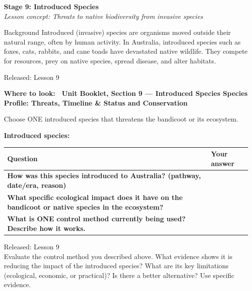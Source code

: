 \documentclass[11pt,a4paper]{article}
\newcommand{\wheretolook}[1]{%
  \par\vspace{2pt}\noindent
  \colorbox{GoldLight}{\parbox{\dimexpr\linewidth-2\fboxsep\relax}{%
    \small\color{GoldDark}\headingfont\bfseries Where to look:\ %
    \normalfont\color{DarkGrey}#1}}\par\vspace{4pt}}
\newcommand{\answerbox}[1]{%
  \begin{tcolorbox}[
    enhanced, breakable, arc=2mm,
    colback=Paper, colframe=Line,
    left=2mm, right=2mm, top=1mm, bottom=1mm,
    boxrule=1pt, height=#1
  ]
  \end{tcolorbox}%
}
\newcommand{\stagediv}[3]{%
  \needspace{6\baselineskip}
  \begin{tcolorbox}[
    enhanced, breakable=false, arc=3.5mm,
    colback=ForestDark, colframe=ForestDark, boxrule=0pt,
    sidebyside, sidebyside align=center,
    lefthand width=2.2cm,
    left=2mm, right=4mm, top=4mm, bottom=4mm
  ]
    \begin{center}
      {\headingfont\bfseries\color{Forest!35!ForestDark}\fontsize{42}{42}\selectfont #1}
    \end{center}
    \tcblower
    {\headingfont\bfseries\color{white}\large Stage #1: #2}\\[3pt]
    {\itshape\color{white!75!ForestDark}\small Lesson concept: #3}
  \end{tcolorbox}%
  \vspace{6pt}%
}
\newcommand{\yr}[2]{\noindent{\headingfont\bfseries\small\color{Forest}%
  \rule[0.2ex]{1.2em}{2pt}\hspace{4pt}#1}\hfill{\small\color{DarkGrey}#2}\\[2pt]}
\newcommand{\yrviii}[2]{\noindent{\headingfont\bfseries\small\color{Violet}%
  \rule[0.2ex]{1.2em}{2pt}\hspace{4pt}#1}\hfill{\small\color{DarkGrey}#2}\\[2pt]}
\begin{document}
\newpage

\stagediv{9}{Introduced Species}{Threats to native biodiversity from invasive species}

\begin{contextbox}{Background}
Introduced (invasive) species are organisms moved outside their natural range, often by human activity. In Australia, introduced species such as foxes, cats, rabbits, and cane toads have devastated native wildlife. They compete for resources, prey on native species, spread disease, and alter habitats.
\end{contextbox}

\bigskip

\begin{yr7box}
\yr{At The Level}{Released: Lesson 9}

\wheretolook{Unit Booklet, Section 9 --- Introduced Species \textbullet{} \textbf{Species Profile: Threats}, \textbf{Timeline \& Status} and \textbf{Conservation}}
Choose ONE introduced species that threatens the bandicoot or its ecosystem.

\medskip
\noindent\textbf{Introduced species:}
\answerbox{1.5cm}

\medskip
\noindent\begin{tabularx}{\linewidth}{|>{\bfseries\raggedleft\arraybackslash}p{4cm}|X|}
  \hline
  \rowcolor{TableHead}
  \headingfont\bfseries\color{white} Question &
  \headingfont\bfseries\color{white} Your answer \\
  \hline
  How was this species introduced to Australia? (pathway, date/era, reason) & \\[80pt]
  \hline
  \rowcolor{RowAlt}
  What specific ecological impact does it have on the bandicoot or native species in the ecosystem? &  \\[80pt]
  \hline
  What is ONE control method currently being used? Describe how it works. & \\[80pt]
  \hline
\end{tabularx}
\end{yr7box}

\bigskip
\newpage
\begin{yr8box}
\yrviii{Above The Level}{Released: Lesson 9}
Evaluate the control method you described above. What evidence shows it is reducing the impact of the introduced species? What are its key limitations (ecological, economic, or practical)? Is there a better alternative? Use specific evidence.
\answerbox{14.5cm}
\end{yr8box}
\end{document}
